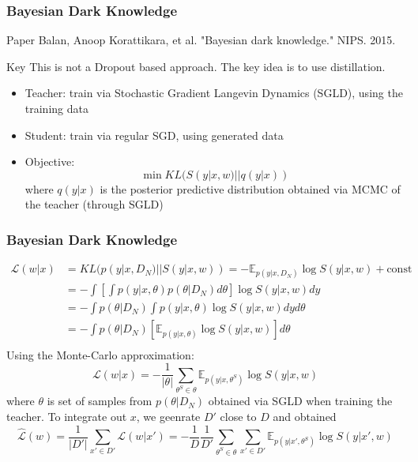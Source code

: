 \documentclass{beamer}
\begin{document}
\begin{frame}
\begin{frame}
\begin{frame}
\begin{frame}
\begin{frame}
\frametitle{Bayesian Dark Knowledge}
\begin{block}{Paper}
Balan, Anoop Korattikara, et al. "Bayesian dark knowledge." NIPS. 2015.
\end{block}

\begin{block}{Key}
This is not a Dropout based approach. The key idea is to use distillation.
\begin{itemize}
\setlength\itemsep{0em}
\item Teacher: train via Stochastic Gradient Langevin Dynamics (SGLD), using the training data
\item Student: train via regular SGD, using generated data
\item Objective:
\[
\min KL(S(y|x,w) || q(y|x))
\]
where $q(y|x)$ is the posterior predictive distribution obtained via MCMC of the teacher (through SGLD)
\end{itemize}
\end{block}

\end{frame}

\begin{frame}
\frametitle{Bayesian Dark Knowledge}
\vspace{-0.2in}
\[
\begin{split}
\mathcal{L}(w|x) &= KL(p(y|x, D_N)||S(y|x,w)) = -\mathbb{E}_{p(y|x, D_N)}\log S(y|x,w) + \text{const} \\
&= -\int[\int p(y|x,\theta)p(\theta|D_N) d\theta] \log S(y|x,w) dy \\
&= -\int p(\theta|D_N) \int p(y|x,\theta) \log S(y|x,w) dy d\theta \\
&= -\int p(\theta|D_N) [\mathbb{E}_{p(y|x,\theta)} \log S(y|x,w)] d\theta \\
\end{split}
\]
Using the Monte-Carlo approximation:
\[
\mathcal{L}(w|x) = -\frac{1}{|\theta|} \sum_{\theta^S \in \theta} \mathbb{E}_{p(y|x, \theta^S)} \log S(y|x,w)
\]
where $\theta$ is set of samples from $p(\theta|D_N)$ obtained via SGLD when training the teacher.
To integrate out $x$, we geenrate $D'$ close to $D$ and obtained
\[
\hat{\mathcal{L}}(w) = \frac{1}{|D'|}\sum_{x' \in D'} \mathcal{L}(w|x') = - \frac{1}{D}\frac{1}{D'}\sum_{\theta^S \in \theta} \sum_{x'\in D'} \mathbb{E}_{p(y|x',\theta^S)} \log S(y|x', w)
\]

\end{frame}


\end{frame}
\end{frame}
\end{frame}
\end{frame}
\end{document}
